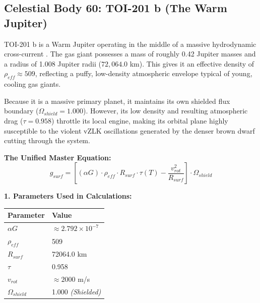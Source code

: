 \documentclass[11pt, a4paper]{article}
\begin{document}
\clearpage
\subsection{Celestial Body 60: TOI-201 b (The Warm Jupiter)}
  TOI-201 b is a Warm Jupiter operating in the middle of a massive hydrodynamic cross-current \cite{hobson2021}. The gas giant possesses a mass of roughly 0.42 Jupiter masses and a radius of 1.008 Jupiter radii ($72,064.0$ km). This gives it an effective density of $\rho_{eff} \approx 509$, reflecting a puffy, low-density atmospheric envelope typical of young, cooling gas giants. 

  Because it is a massive primary planet, it maintains its own shielded flux boundary ($\Omega_{shield} = 1.000$). However, its low density and resulting atmospheric drag ($\tau = 0.958$) throttle its local engine, making its orbital plane highly susceptible to the violent vZLK oscillations generated by the denser brown dwarf cutting through the system.

  \vspace{0.5em}
  \noindent \textbf{The Unified Master Equation:}
  $$ g_{surf} = \left[ (\alpha G) \cdot \rho_{eff} \cdot R_{surf} \cdot \tau(T) - \frac{v_{rot}^2}{R_{surf}} \right] \cdot \Omega_{shield} $$

  \vspace{0.5em}
  \noindent \textbf{1. Parameters Used in Calculations:} \\[0.5em]
  \begingroup
  \renewcommand{\arraystretch}{1.3}
  \hspace*{2em}
  \begin{tabular}{|l|l|}
    \hline
    \textbf{Parameter} & \textbf{Value} \\ \hline
    $\alpha G$ & $\approx 2.792 \times 10^{-7}$ \\ \hline
    $\rho_{eff}$ & 509 \\ \hline
    $R_{surf}$ & 72064.0 km \\ \hline
    $\tau$ & 0.958 \\ \hline
    $v_{rot}$ & $\approx 2000$ m/s \\ \hline
    $\Omega_{shield}$ & 1.000 \textit{(Shielded)} \\ \hline
  \end{tabular}
  \endgroup
\end{document}
